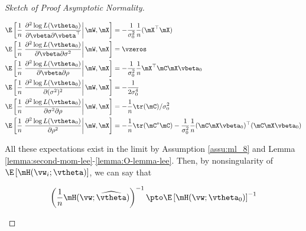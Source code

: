 \documentclass[english,12pt]{book}\usepackage[]{graphicx}\usepackage[]{xcolor}
\begin{document}
\begin{proof}[Sketch of Proof Asymptotic Normality]
\begin{enumerate}
   \begin{equation*}
    \begin{aligned}
     \E\left[\frac{1}{n}\left.\frac{\partial^2  \log L(\vtheta_0)}{\partial \vbeta \partial \vbeta^\top} \right|\mW, \mX\right] & = -\frac{1}{\sigma^2_0}\frac{1}{n}(\mX^\top\mX) \\
     \E\left[\frac{1}{n}\left.\frac{\partial^2  \log L(\vtheta_0)}{\partial \vbeta \partial \sigma^2} \right|\mW, \mX\right] & = \vzeros \\
      \E\left[\frac{1}{n}\left.\frac{\partial^2  \log L(\vtheta_0)}{\partial \vbeta \partial \rho} \right|\mW, \mX\right] & = - \frac{1}{\sigma^2_0} \frac{1}{n}\mX^\top\mC\mX\vbeta_0 \\
      \E\left[\frac{1}{n}\left.\frac{\partial^2 \log L(\vtheta_0)}{\partial (\sigma^2)^2}\right|\mW, \mX\right] & = - \frac{1}{2\sigma^4_0}  \\
      \E\left[\frac{1}{n}\left.\frac{\partial^2 \log L(\vtheta_0)}{\partial \sigma^2 \partial \rho}\right|\mW,\mX\right] & = - \frac{1}{n}\tr(\mC)/\sigma^2_0 \\
      \E\left[\frac{1}{n}\left.\frac{\partial^2 \log L(\vtheta_0)}{\partial \rho ^2}\right|\mW, \mX\right] & = - \frac{1}{n}\tr(\mC^s\mC) - \frac{1}{\sigma^2_0}\frac{1}{n}(\mC\mX\vbeta_0)^\top(\mC\mX\vbeta_0)
    \end{aligned}
   \end{equation*}
   
   All these expectations exist in the limit by Assumption \ref{assu:ml_8} and Lemma \ref{lemma:second-mom-lee}-\ref{lemma:O-lemma-lee}. Then, by nonsingularity of $\E\left[\mH(\vw_i;\vtheta)\right]$, we can say that 
   
   \begin{equation*}
   \left(\frac{1}{n}\mH(\vw;\widehat{\vtheta})\right)^{-1}\pto \E\left[\mH(\vw;\vtheta_0)\right]^{-1}
   \end{equation*}
   

   

\end{enumerate}
\end{proof}
\end{document}
